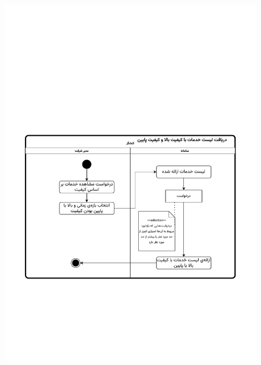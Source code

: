 \begin{figure}[ht!]
	\centering
	\includegraphics[scale=0.8, page=1]{figs/OOD-activity-quality.pdf}
\end{figure}
\FloatBarrier
\newpage

